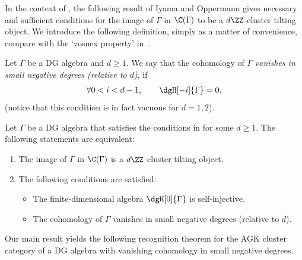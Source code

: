 \documentclass[a4paper]{amsart}
\begin{document}
In the context of , the following result of Iyama and
Oppermann gives necessary and sufficient conditions for the image of $\Gamma$ in
$\C(\Gamma)$ to be a $d\ZZ$-cluster tilting object. We introduce the following
definition, simply as a matter of convenience, compare with the `vosnex
property' in~\cite[Not.~3.5]{IO13}.

\begin{definition}
  \label{def:vosnex}
  Let $\Gamma$ be a DG algebra and $d\geq1$. We say that the cohomology of
  $\Gamma$ \emph{vanishes in small negative degrees (relative to $d$)}, if
  \[
    \forall 0<i<d-1,\qquad \dgH[-i]{\Gamma}=0.
  \]
  (notice that this condition is in fact vacuous for $d=1,2$).
\end{definition}

\begin{proposition}[{\cite[Prop.~3.6]{IO11}}]
  \label{prop:Gamma_dZ_in_CGamma}
  Let $\Gamma$ be a DG algebra that satisfies the conditions in
   for some $d\geq1$. The following statements are
  equivalent:
  \begin{enumerate}
  \item The image of $\Gamma$ in $\C(\Gamma)$ is a $d\ZZ$-cluster tilting
    object.
  \item The following conditions are satisfied:
    \begin{itemize}
    \item The finite-dimensional algebra $\dgH[0]{\Gamma}$ is self-injective.
    \item The cohomology of $\Gamma$ vanishes in small negative degrees
      (relative to $d$).
    \end{itemize}    
  \end{enumerate}
\end{proposition}

Our main result yields the following recognition theorem for the AGK cluster
category of a DG algebra with vanishing cohomology in small negative degrees.
\end{document}
